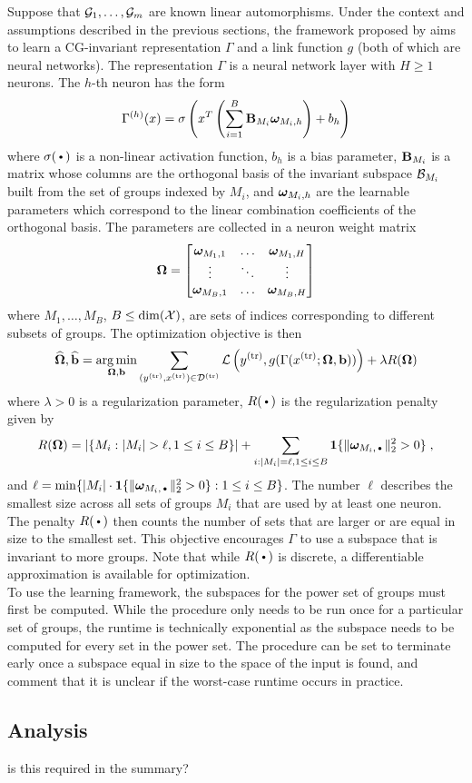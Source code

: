 Suppose that $\mathcal{G}_1,\ldots,\mathcal{G}_m$ are known linear automorphisms. Under the context and assumptions described in the previous sections, the framework proposed by \textcite{Mouli:2021} aims to learn a CG-invariant representation $\Gamma$ and a link function $g$ (both of which are neural networks). The representation $\Gamma$ is a neural network layer with $H\geq1$ neurons. The $h$-th neuron has the form
\[
\Gamma^{(h)}(x) = \sigma\left(x^T\left(\sum_{i=1}^B\mathbf{B}_{M_i}\bm{\omega}_{M_i,h}\right)+b_h\right)
\]
where $\sigma(\argdot)$ is a non-linear activation function, $b_h$ is a bias parameter, $\mathbf{B}_{M_i}$ is a matrix whose columns are the orthogonal basis of the invariant subspace $\mathcal{B}_{M_i}$ built from the set of groups indexed by $M_i$, and $\bm{\omega}_{M_i,h}$ are the learnable parameters which correspond to the linear combination coefficients of the orthogonal basis. The parameters are collected in a neuron weight matrix
\[
\bm{\Omega} =
\begin{bmatrix}
\bm{\omega}_{M_1,1} & \ldots & \bm{\omega}_{M_1,H} \\
\vdots & \ddots & \vdots \\
\bm{\omega}_{M_B,1} & \ldots & \bm{\omega}_{M_B,H}
\end{bmatrix}
\]
where $M_1,\ldots,M_B$, $B\leq \mathrm{dim}(\mathcal{X})$, are sets of indices corresponding to different subsets of groups. The optimization objective is then
\[
\widehat{\bm{\Omega}},\widehat{\mathbf{b}} = \operatorname*{arg\,min}_{\bm{\Omega},\mathbf{b}}\sum_{(y^\text{(tr)},x^\text{(tr)})\in\mathcal{D}^\text{(tr)}}\mathcal{L}\left(y^\text{(tr)},g(\Gamma(x^\text{(tr)};\bm{\Omega},\mathbf{b}))\right)+ \lambda R(\bm{\Omega})
\]
where $\lambda>0$ is a regularization parameter, $R(\argdot)$ is the regularization penalty given by
\[
R(\bfOm) = \left|\{M_i:|M_i|>\ell, 1\leq i\leq B\}\right| + \sum_{i:|M_i|=\ell,1\leq i\leq B}\onevec\{\|\bfom_{M_i,\argdot}\|_2^2>0\}\;,
\]
and $\ell = \min\{|M_i|\cdot\onevec\{\|\bfom_{M_i,\argdot}\|_2^2>0\}: 1\leq i \leq B\}$. The number $\ell$ describes the smallest size across all sets of groups $M_i$ that are used by at least one neuron. The penalty $R(\argdot)$ then counts the number of sets that are larger or are equal in size to the smallest set. This objective encourages $\Gamma$ to use a subspace that is invariant to more groups. Note that while $R(\argdot)$ is discrete, a differentiable approximation is available for optimization.
\\

To use the learning framework, the subspaces for the power set of groups must first be computed. While the procedure only needs to be run once for a particular set of groups, the runtime is technically exponential as the subspace needs to be computed for every set in the power set. The procedure can be set to terminate early once a subspace equal in size to the space of the input is found, and \citeauthor{Mouli:2021} comment that it is unclear if the worst-case runtime occurs in practice.

\subsection{Analysis}

\todo is this required in the summary?
